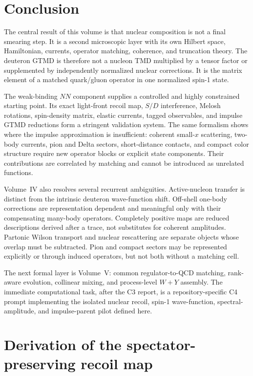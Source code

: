 \documentclass[11pt]{article}
\begin{document}
\section{Conclusion}
\label{sec:conclusion}

The central result of this volume is that nuclear composition is not a final
smearing step.  It is a second microscopic layer with its own Hilbert space,
Hamiltonian, currents, operator matching, coherence, and truncation theory.
The deuteron GTMD is therefore not a nucleon TMD multiplied by a tensor factor
or supplemented by independently normalized nuclear corrections.  It is the
matrix element of a matched quark/gluon operator in one normalized spin-1
state.

The weak-binding \(NN\) component supplies a controlled and highly constrained
starting point.  Its exact light-front recoil map, \(S/D\) interference,
Melosh rotations, spin-density matrix, elastic currents, tagged observables,
and impulse GTMD reductions form a stringent validation system.  The same
formalism shows where the impulse approximation is insufficient: coherent
small-\(x\) scattering, two-body currents, pion and Delta sectors,
short-distance contacts, and compact color structure require new operator
blocks or explicit state components.  Their contributions are correlated by
matching and cannot be introduced as unrelated functions.

Volume~IV also resolves several recurrent ambiguities.  Active-nucleon
transfer is distinct from the intrinsic deuteron wave-function shift.
Off-shell one-body corrections are representation dependent and meaningful
only with their compensating many-body operators.  Completely positive maps
are reduced descriptions derived after a trace, not substitutes for coherent
amplitudes.  Partonic Wilson transport and nuclear rescattering are separate
objects whose overlap must be subtracted.  Pion and compact sectors may be
represented explicitly or through induced operators, but not both without a
matching cell.

The next formal layer is Volume~V: common regulator-to-QCD matching,
rank-aware evolution, collinear mixing, and process-level \(W+Y\) assembly.
The immediate computational task, after the C3 report, is a repository-specific
C4 prompt implementing the isolated nuclear recoil, spin-1 wave-function,
spectral-amplitude, and impulse-parent pilot defined here.

\appendix

\section{Derivation of the spectator-preserving recoil map}
\label{app:recoil-derivation}
\end{document}

